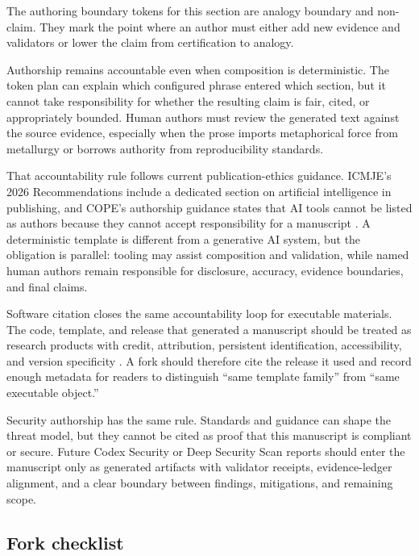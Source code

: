 \documentclass[
]{article}
\begin{document}
The authoring boundary tokens for this section are analogy boundary and
non-claim. They mark the point where an author must either add new
evidence and validators or lower the claim from certification to
analogy.

Authorship remains accountable even when composition is deterministic.
The token plan can explain which configured phrase entered which
section, but it cannot take responsibility for whether the resulting
claim is fair, cited, or appropriately bounded. Human authors must
review the generated text against the source evidence, especially when
the prose imports metaphorical force from metallurgy or borrows
authority from reproducibility standards.

That accountability rule follows current publication-ethics guidance.
ICMJE's 2026 Recommendations include a dedicated section on artificial
intelligence in publishing, and COPE's authorship guidance states that
AI tools cannot be listed as authors because they cannot accept
responsibility for a manuscript
\citep{icmje2026recommendations, cope2023ai}. A deterministic template
is different from a generative AI system, but the obligation is
parallel: tooling may assist composition and validation, while named
human authors remain responsible for disclosure, accuracy, evidence
boundaries, and final claims.

Software citation closes the same accountability loop for executable
materials. The code, template, and release that generated a manuscript
should be treated as research products with credit, attribution,
persistent identification, accessibility, and version specificity
\citep{smith2016softwarecitation}. A fork should therefore cite the
release it used and record enough metadata for readers to distinguish
``same template family'' from ``same executable object.''

Security authorship has the same rule. Standards and guidance can shape
the threat model, but they cannot be cited as proof that this manuscript
is compliant or secure. Future Codex Security or Deep Security Scan
reports should enter the manuscript only as generated artifacts with
validator receipts, evidence-ledger alignment, and a clear boundary
between findings, mitigations, and remaining scope.

\subsection{Fork checklist}\label{fork-checklist}
\end{document}
